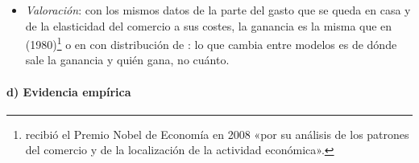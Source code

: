 \documentclass[11pt]{article}
\begin{document}
\begin{itemize}
\item \emph{Valoración}: con los mismos datos de la parte del gasto que se queda en casa y de la elasticidad del comercio a sus costes, la ganancia es la misma que en  (1980)\footnote{ recibió el Premio Nobel de Economía en 2008 «por su análisis de los patrones del comercio y de la localización de la actividad económica»\nocite{Nobel2008Krugman}.} o en  con distribución de \nocite{ArkolakisCostinotRodriguezClare2012New} : lo que cambia entre modelos es de dónde sale la ganancia y quién gana, no cuánto.
\end{itemize}

\paragraph{d) Evidencia empírica}
\end{document}
